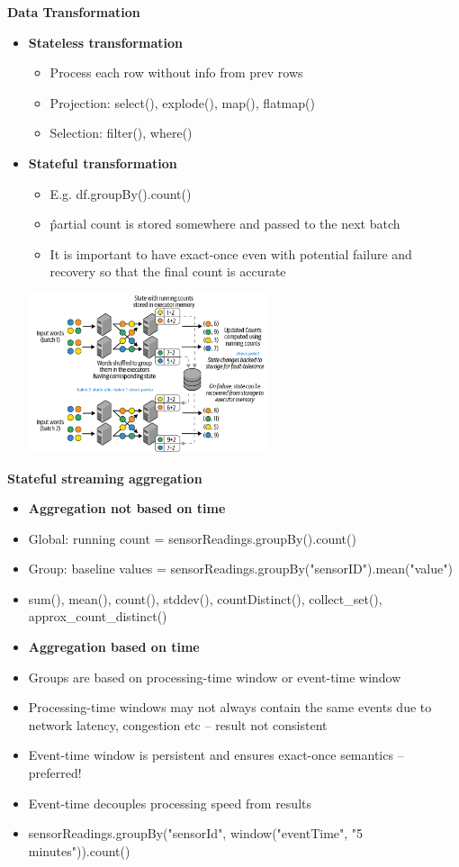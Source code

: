 \documentclass[10pt, landscape]{article}
\begin{document}
\begin{multicols}{4}
\textbf{Data Transformation}
\begin{itemize}
  \item \textbf{Stateless transformation}
  \begin{itemize}
    \item Process each row without info from prev rows 
    \item Projection: select(), explode(), map(), flatmap()
    \item Selection: filter(), where()
  \end{itemize}
  \item \textbf{Stateful transformation}
  \begin{itemize}
    \item E.g. df.groupBy().count()
    \item \^ partial count is stored somewhere and passed to the next batch
    \item It is important to have exact-once even with potential failure and recovery so that the final count is accurate
  \end{itemize}
  \includegraphics*[width=7cm]{spark_stateful.png}
\end{itemize}

\textbf{Stateful streaming aggregation}
\begin{itemize}
  \item \textbf{Aggregation not based on time}
  \item Global: running count = sensorReadings.groupBy().count()
  \item Group: baseline values = sensorReadings.groupBy("sensorID").mean("value")
  \item sum(), mean(), count(), stddev(), countDistinct(), collect\_set(), approx\_count\_distinct()
  \item \textbf{Aggregation based on time}
  \item Groups are based on processing-time window  or event-time window
  \item Processing-time windows may not always contain the same events due to network latency, congestion etc -- result not consistent 
  \item Event-time window is persistent and ensures exact-once semantics -- preferred!
  \item Event-time decouples processing speed from results
  \item sensorReadings.groupBy("sensorId", window("eventTime", "5 minutes")).count()
\end{itemize}



\end{multicols}
\end{document}
